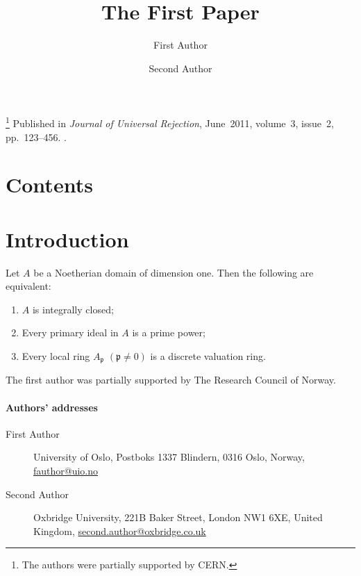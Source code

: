 \documentclass{standalone}
\begin{document}
\author
{
    First Author
    \and
    Second Author
}
\title{The First Paper}
\thanks{The authors were partially supported by CERN.}
\metadata
{
    Published in \emph{Journal of Universal Rejection},
    June~2011,
    volume~3,
    issue~2,
    pp.~123--456.
    .
}
\maketitle
\label{pap:first}

\begin{abstract}
    \kant[7]     %
\end{abstract}

\section*{Contents}
\startcontents[chapters]

\section{Introduction}

\kant[8-11]      %

\begin{theorem}
    \label{thm:dedekind}
    Let \( A \) be a Noetherian domain of dimension one. Then the following are equivalent:
    \begin{enumerate}
        \item
        \( A \) is integrally closed;

        \item
        Every primary ideal in \( A \) is a prime power;

        \item
        Every local ring \( A_\mathfrak{p} \) \( (\mathfrak{p} \neq 0) \) is a discrete valuation ring.
    \end{enumerate}
\end{theorem}

\begin{acknowledgements}
    The first author was partially supported by The Research Council of Norway.
\end{acknowledgements}

\stopcontents[chapters]

\paragraph{Authors' addresses}
\begin{description}
    \item[First Author]
    University of Oslo,
    Postboks 1337 Blindern, 0316 Oslo, Norway,
    \href{mailto:fauthor@uio.no}{fauthor@uio.no}

    \item[Second Author]
    Oxbridge University,
    221B Baker Street, London NW1 6XE, United Kingdom,
    \href{mailto:second.author@oxbridge.co.uk}{second.author@oxbridge.co.uk}
\end{description}
\end{document}
